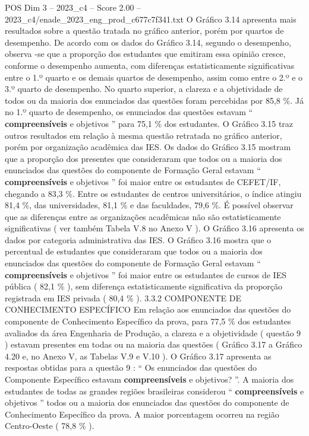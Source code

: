 \begin{textsample}{POS Dim 3 – 2023\_c4 – Score 2.00 – 2023\_c4/enade\_2023\_eng\_prod\_c677c7f341.txt}
O Gráfico 3.14 apresenta mais resultados sobre a questão tratada no gráfico anterior, porém por quartos de desempenho.
De acordo com os dados do Gráfico 3.14, segundo o desempenho, observa -se que a proporção dos estudantes que emitiram essa opinião cresce, conforme o desempenho aumenta, com diferenças estatisticamente significativas entre o 1.º quarto e os demais quartos de desempenho, assim como entre o 2.º e o 3.º quarto de desempenho.
No quarto superior, a clareza e a objetividade de todos ou da maioria dos enunciados das questões foram percebidas por 85,8 \%.
Já no 1.º quarto de desempenho, os enunciados das questões estavam “ \textbf{compreensíveis} e objetivos ” para 75,1 \% dos estudantes.
O Gráfico 3.15 traz outros resultados em relação à mesma questão retratada no gráfico anterior, porém por organização acadêmica das IES.
Os dados do Gráfico 3.15 mostram que a proporção dos presentes que consideraram que todos ou a maioria dos enunciados das questões do componente de Formação Geral estavam “ \textbf{compreensíveis} e objetivos ” foi maior entre os estudantes de CEFET/IF, chegando a 83,3 \%.
Entre os estudantes de centros universitários, o índice atingiu 81,4 \%, das universidades, 81,1 \% e das faculdades, 79,6 \%.
É possível observar que as diferenças entre as organizações acadêmicas não são estatisticamente significativas ( ver também Tabela V.8 no Anexo V ).
O Gráfico 3.16 apresenta os dados por categoria administrativa das IES.
O Gráfico 3.16 mostra que o percentual de estudantes que consideraram que todos ou a maioria dos enunciados das questões do componente de Formação Geral estavam “ \textbf{compreensíveis} e objetivos ” foi maior entre os estudantes de cursos de IES pública ( 82,1 \% ), sem diferença estatisticamente significativa da proporção registrada em IES privada ( 80,4 \% ). 3.3.2 COMPONENTE DE CONHECIMENTO ESPECÍFICO Em relação aos enunciados das questões do componente de Conhecimento Específico da prova, para 77,5 \% dos estudantes avaliados da área Engenharia de Produção, a clareza e a objetividade ( questão 9 ) estavam presentes em todas ou na maioria das questões ( Gráfico 3.17 a Gráfico 4.20 e, no Anexo V, as Tabelas V.9 e V.10 ).
O Gráfico 3.17 apresenta as respostas obtidas para a questão 9 : “ Os enunciados das questões do Componente Específico estavam \textbf{compreensíveis} e objetivos? ”.
A maioria dos estudantes de todas as grandes regiões brasileiras considerou “ \textbf{compreensíveis} e objetivos ” todos ou a maioria dos enunciados das questões do componente de Conhecimento Específico da prova.
A maior porcentagem ocorreu na região Centro-Oeste ( 78,8 \% ).

\end{textsample}
